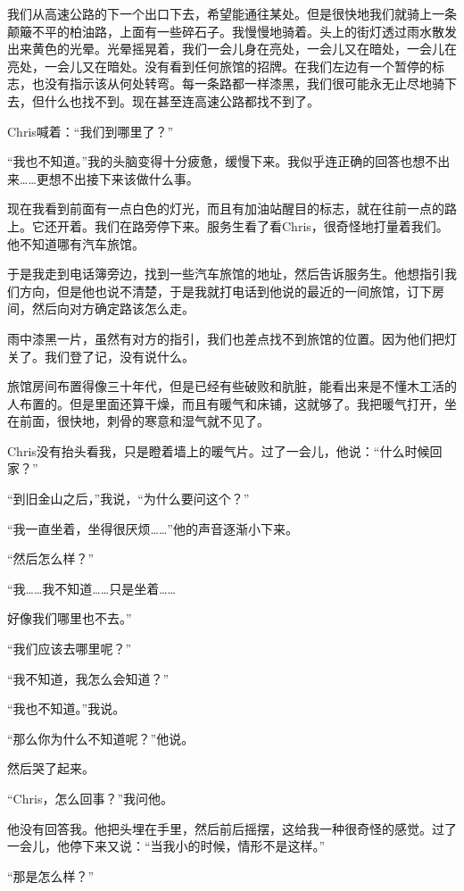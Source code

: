 \documentclass[UTF8]{article}
\begin{document}
\par 我们从高速公路的下一个出口下去，希望能通往某处。但是很快地我们就骑上一条颠簸不平的柏油路，上面有一些碎石子。我慢慢地骑着。头上的街灯透过雨水散发出来黄色的光晕。光晕摇晃着，我们一会儿身在亮处，一会儿又在暗处，一会儿在亮处，一会儿又在暗处。没有看到任何旅馆的招牌。在我们左边有一个暂停的标志，也没有指示该从何处转弯。每一条路都一样漆黑，我们很可能永无止尽地骑下去，但什么也找不到。现在甚至连高速公路都找不到了。
\par Chris喊着：“我们到哪里了？”
\par “我也不知道。”我的头脑变得十分疲惫，缓慢下来。我似乎连正确的回答也想不出来……更想不出接下来该做什么事。
\par 现在我看到前面有一点白色的灯光，而且有加油站醒目的标志，就在往前一点的路上。它还开着。我们在路旁停下来。服务生看了看Chris，很奇怪地打量着我们。他不知道哪有汽车旅馆。
\par 于是我走到电话簿旁边，找到一些汽车旅馆的地址，然后告诉服务生。他想指引我们方向，但是他也说不清楚，于是我就打电话到他说的最近的一间旅馆，订下房间，然后向对方确定路该怎么走。
\par 雨中漆黑一片，虽然有对方的指引，我们也差点找不到旅馆的位置。因为他们把灯关了。我们登了记，没有说什么。
\par 旅馆房间布置得像三十年代，但是已经有些破败和肮脏，能看出来是不懂木工活的人布置的。但是里面还算干燥，而且有暖气和床铺，这就够了。我把暖气打开，坐在前面，很快地，刺骨的寒意和湿气就不见了。
\par Chris没有抬头看我，只是瞪着墙上的暖气片。过了一会儿，他说：“什么时候回家？”
\par “到旧金山之后，”我说，“为什么要问这个？”
\par “我一直坐着，坐得很厌烦……”他的声音逐渐小下来。
\par “然后怎么样？”
\par “我……我不知道……只是坐着……
\par 好像我们哪里也不去。”
\par “我们应该去哪里呢？”
\par “我不知道，我怎么会知道？”
\par “我也不知道。”我说。
\par “那么你为什么不知道呢？”他说。
\par 然后哭了起来。
\par “Chris，怎么回事？”我问他。
\par 他没有回答我。他把头埋在手里，然后前后摇摆，这给我一种很奇怪的感觉。过了一会儿，他停下来又说：“当我小的时候，情形不是这样。”
\par “那是怎么样？”
\end{document}
